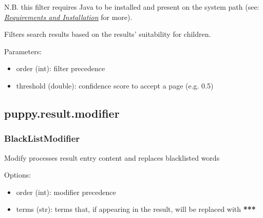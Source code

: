 \documentclass[letterpaper,10pt,english]{sphinxmanual}
\begin{document}
N.B. this filter requires Java to be installed and present on the system path (see: {\hyperref[installation:requirements-and-installation]{\emph{Requirements and Installation}}} for more).

\begin{fulllineitems}
\label{api2.0:puppy.result.filter.SuitabilityFilter}
Filters search results based on the results' suitability for children.

Parameters:
\begin{itemize}
\item {} 
order (int): filter precedence

\item {} 
threshold (double): confidence score to accept a page (e.g. 0.5)

\end{itemize}

\end{fulllineitems}



\subsection{puppy.result.modifier}
\label{api2.0:puppy-result-modifier}\label{api2.0:module-puppy.result.modifier}

\subsubsection{BlackListModifier}
\label{api2.0:blacklistmodifier}

\begin{fulllineitems}
\label{api2.0:puppy.result.modifier.BlackListResultModifier}
Modify processes result entry content and replaces blacklisted words

Options:
\begin{itemize}
\item {} 
order (int): modifier precedence

\item {} 
terms (str): terms that, if appearing in the result, will be replaced with {\color{red}\bfseries{}**}{\color{red}\bfseries{}*}

\end{itemize}

\end{fulllineitems}
\end{document}

